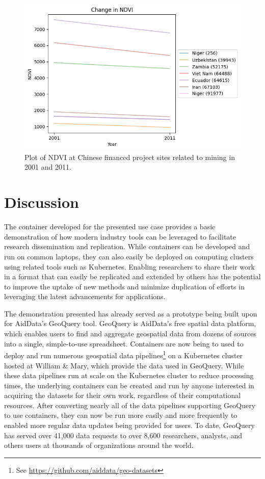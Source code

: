 \documentclass[a4paper]{article}
\begin{document}
\begin{figure}
    \centering
    \includegraphics[width=0.7\linewidth]{report/ndvi.png}
    \caption{
        \small
        Plot of NDVI at Chinese financed project sites related to mining in 2001 and 2011.
    }
    \label{fig:ndvi}
\end{figure}



\section{Discussion}

The container developed for the presented use case provides a basic demonstration of how modern industry tools can be leveraged to facilitate research dissemination and replication. While containers can be developed and run on common laptops, they can also easily be deployed on computing clusters using related tools such as Kubernetes. Enabling researchers to share their work in a format that can easily be replicated and extended by others has the potential to improve the uptake of new methods and minimize duplication of efforts in leveraging the latest advancements for applications.

The demonstration presented has already served as a prototype being built upon for AidData's GeoQuery tool. GeoQuery is AidData's free spatial data platform, which enables users to find and aggregate geospatial data from dozens of sources into a single, simple-to-use spreadsheet\citep{Goodman2019}. Containers are now being to used to deploy and run numerous geospatial data pipelines\footnote{See \url{https://github.com/aiddata/geo-datasets}} on a Kubernetes cluster hosted at William \& Mary, which provide the data used in GeoQuery. While these data pipelines run at scale on the Kubernetes cluster to reduce processing times, the underlying containers can be created and run by anyone interested in acquiring the datasets for their own work, regardless of their computational resources. After converting nearly all of the data pipelines supporting GeoQuery to use containers, they can now be run more easily and more frequently to enabled more regular data updates being provided for users. To date, GeoQuery has served over 41,000 data requests to over 8,600 researchers, analysts, and others users at thousands of organizations around the world. 
\end{document}
